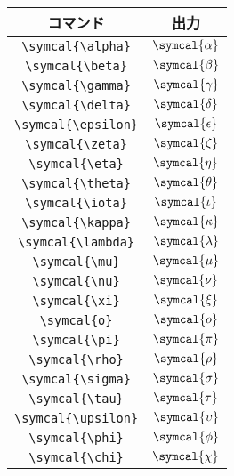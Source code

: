 \begin{table}[htbp]
    \centering
    \begin{subfigure}{.5\textwidth}
        \centering
        \begin{tabular}{cc}
            \toprule
            コマンド                 & 出力                  \\
            \midrule
            \verb|\symcal{\alpha}|   & \(\symcal{\alpha}\)   \\
            \verb|\symcal{\beta}|    & \(\symcal{\beta}\)    \\
            \verb|\symcal{\gamma}|   & \(\symcal{\gamma}\)   \\
            \verb|\symcal{\delta}|   & \(\symcal{\delta}\)   \\
            \verb|\symcal{\epsilon}| & \(\symcal{\epsilon}\) \\
            \verb|\symcal{\zeta}|    & \(\symcal{\zeta}\)    \\
            \verb|\symcal{\eta}|     & \(\symcal{\eta}\)     \\
            \verb|\symcal{\theta}|   & \(\symcal{\theta}\)   \\
            \verb|\symcal{\iota}|    & \(\symcal{\iota}\)    \\
            \verb|\symcal{\kappa}|   & \(\symcal{\kappa}\)   \\
            \verb|\symcal{\lambda}|  & \(\symcal{\lambda}\)  \\
            \verb|\symcal{\mu}|      & \(\symcal{\mu}\)      \\
            \verb|\symcal{\nu}|      & \(\symcal{\nu}\)      \\
            \verb|\symcal{\xi}|      & \(\symcal{\xi}\)      \\
            \verb|\symcal{o}|        & \(\symcal{o}\)        \\
            \verb|\symcal{\pi}|      & \(\symcal{\pi}\)      \\
            \verb|\symcal{\rho}|     & \(\symcal{\rho}\)     \\
            \verb|\symcal{\sigma}|   & \(\symcal{\sigma}\)   \\
            \verb|\symcal{\tau}|     & \(\symcal{\tau}\)     \\
            \verb|\symcal{\upsilon}| & \(\symcal{\upsilon}\) \\
            \verb|\symcal{\phi}|     & \(\symcal{\phi}\)     \\
            \verb|\symcal{\chi}|     & \(\symcal{\chi}\)     \\

\end{tabular}
\end{subfigure}
\end{table}
